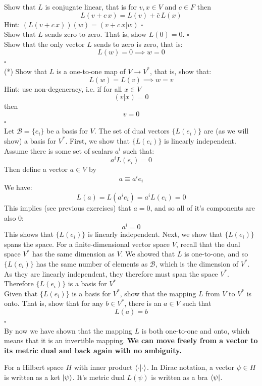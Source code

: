 \documentclass[12pt]{article}
\begin{document}
\exercise Show that $L$ is conjugate linear, that is for $v,x \in V$ and $c \in F$ then
$$L(v + c \, x) = L(v) + \bar{c} \, L(x)$$
Hint: $(L(v + c \, x))(w) = (v + c \, x | w)$  $\square$ \\[3pt]

\exercise Show that $L$ sends zero to zero. That is, show $L(0) = 0$.  $\square$ \\[3pt]

\exercise Show that the only vector $L$ sends to zero is zero, that is:
$$L(w)=0 \implies w=0$$
 $\square$ \\[3pt]

\exercise (*) Show that $L$ is a one-to-one map of $V \to V^*$, that is, show that:
$$L(w) = L(v) \implies w=v$$
Hint: use non-degeneracy, i.e. if for all $x \in V$
$$(v|x) = 0$$
then
$$v=0$$
$\square$ \\[3pt]

\noindent
Let $\mathcal{B} = \{ e_i\}$ be a basis for $V$.  The set of dual
vectors $\{L(e_i)\}$ are (as we will show) a basis for
$V^*$.
First, we show that $\{L(e_i)\}$ is linearly independent. Assume there
is some set of scalars $a^i$ such that:
$$a^i L(e_i) = 0$$
Then define a vector $a \in V$ by
$$a \equiv a^i e_i $$
We have:
$$L(a) = L(a^i e_i) = a^i L(e_i) = 0$$
This implies (see previous exercises) that $a=0$, and so all of it's components are also 0:
$$a^i = 0$$
This shows that $\{L(e_i)\}$ is linearly independent.  Next, we show
that $\{L(e_i)\}$ spans the space.  For a finite-dimensional vector
space $V$, recall that the dual space $V^*$ has the same dimension as
$V$.  We showed that $L$ is one-to-one, and so $\{L(e_i)\}$ has the
same number of elements as $\mathcal{B}$, which is the dimension of
$V^*$.  As they are linearly independent, they therefore must span the
space $V^*$.  Therefore $\{L(e_i)\}$ is a basis for $V^*$\\[3pt]

\exercise Given that $\{L(e_i)\}$ is a basis for $V^*$, show that the
mapping $L$ from $V$ to $V^*$ is onto.  That is, show that for any $b
\in V^*$, there is an $a \in V $ such that
$$L(a) = b$$ $\square$ \\[3pt]

\noindent
By now we have shown that the mapping $L$ is both one-to-one and onto,
which means that it is an invertible mapping.  {\bf We can move freely from
a vector to its metric dual and back again with no ambiguity.}

For a Hilbert space $H$ with inner product $\braket{\cdot|\cdot}$.  In
Dirac notation, a vector $\psi \in H$ is written as a ket
$\ket{\psi}$. It's metric dual $L(\psi)$ is written as a bra
$\bra{\psi}$.\\[3pt]
\end{document}

